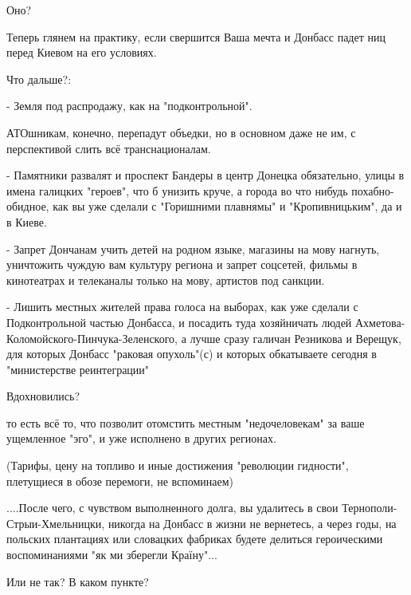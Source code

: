 Оно?

Теперь глянем на практику, если свершится Ваша мечта и Донбасс падет ниц перед
Киевом на его условиях.

Что дальше?:

- Земля под распродажу, как на "подконтрольной". 

АТОшникам, конечно, перепадут объедки, но в основном даже не им, с перспективой
слить всё транснационалам.

- Памятники развалят и проспект Бандеры в центр Донецка обязательно, улицы в
имена галицких "героев", что б унизить круче, а города во что нибудь
похабно-обидное, как вы уже сделали с "Горишними плавнямы" и "Кропивницьким",
да и в Киеве.

- Запрет Дончанам учить детей на родном языке, магазины на мову нагнуть,
уничтожить чуждую вам культуру региона и запрет соцсетей, фильмы в кинотеатрах
и телеканалы только на мову, артистов под санкции.

- Лишить местных жителей права голоса на выборах, как уже сделали с
Подконтрольной частью Донбасса, и посадить туда хозяйничать людей
Ахметова-Коломойского-Пинчука-Зеленского, а лучше сразу галичан Резникова и
Верещук, для которых Донбасс "раковая опухоль"(с) и которых обкатываете сегодня
в "министерстве реинтеграции" 

Вдохновились?

то есть всё то, что позволит отомстить местным "недочеловекам" за ваше
ущемленное "эго", и уже исполнено в других регионах. 

(Тарифы, цену на топливо и иные достижения "революции гидности", плетущиеся в
обозе перемоги, не вспоминаем)

....После чего, с чувством выполненного долга, вы удалитесь в свои
Тернополи-Стрыи-Хмельницки, никогда на Донбасс в жизни не вернетесь, а через
годы, на польских плантациях или словацких фабриках будете делиться
героическими воспоминаниями "як ми зберегли Країну"... 

Или не так? В каком пункте?

